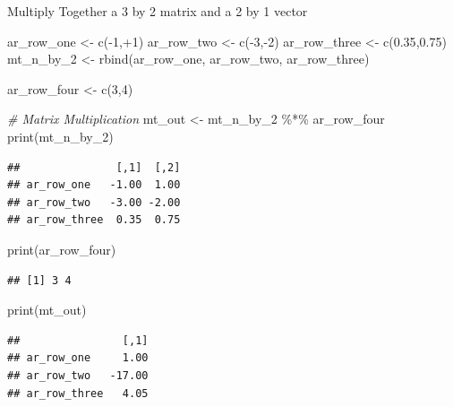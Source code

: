 \documentclass[
]{book}
\newenvironment{Shaded}{\begin{snugshade}}{\end{snugshade}}
\newcommand{\CommentTok}[1]{\textcolor[rgb]{0.56,0.35,0.01}{\textit{#1}}}
\newcommand{\DecValTok}[1]{\textcolor[rgb]{0.00,0.00,0.81}{#1}}
\newcommand{\FloatTok}[1]{\textcolor[rgb]{0.00,0.00,0.81}{#1}}
\newcommand{\FunctionTok}[1]{\textcolor[rgb]{0.00,0.00,0.00}{#1}}
\newcommand{\NormalTok}[1]{#1}
\newcommand{\OtherTok}[1]{\textcolor[rgb]{0.56,0.35,0.01}{#1}}
\newcommand{\SpecialCharTok}[1]{\textcolor[rgb]{0.00,0.00,0.00}{#1}}
\begin{document}
Multiply Together a 3 by 2 matrix and a 2 by 1 vector

\begin{Shaded}
\begin{Highlighting}[]
\NormalTok{ar\_row\_one }\OtherTok{\textless{}{-}} \FunctionTok{c}\NormalTok{(}\SpecialCharTok{{-}}\DecValTok{1}\NormalTok{,}\SpecialCharTok{+}\DecValTok{1}\NormalTok{)}
\NormalTok{ar\_row\_two }\OtherTok{\textless{}{-}} \FunctionTok{c}\NormalTok{(}\SpecialCharTok{{-}}\DecValTok{3}\NormalTok{,}\SpecialCharTok{{-}}\DecValTok{2}\NormalTok{)}
\NormalTok{ar\_row\_three }\OtherTok{\textless{}{-}} \FunctionTok{c}\NormalTok{(}\FloatTok{0.35}\NormalTok{,}\FloatTok{0.75}\NormalTok{)}
\NormalTok{mt\_n\_by\_2 }\OtherTok{\textless{}{-}} \FunctionTok{rbind}\NormalTok{(ar\_row\_one, ar\_row\_two, ar\_row\_three)}

\NormalTok{ar\_row\_four }\OtherTok{\textless{}{-}} \FunctionTok{c}\NormalTok{(}\DecValTok{3}\NormalTok{,}\DecValTok{4}\NormalTok{)}

\CommentTok{\# Matrix Multiplication}
\NormalTok{mt\_out }\OtherTok{\textless{}{-}}\NormalTok{ mt\_n\_by\_2 }\SpecialCharTok{\%*\%}\NormalTok{ ar\_row\_four}
\FunctionTok{print}\NormalTok{(mt\_n\_by\_2)}
\end{Highlighting}
\end{Shaded}

\begin{verbatim}
##               [,1]  [,2]
## ar_row_one   -1.00  1.00
## ar_row_two   -3.00 -2.00
## ar_row_three  0.35  0.75
\end{verbatim}

\begin{Shaded}
\begin{Highlighting}[]
\FunctionTok{print}\NormalTok{(ar\_row\_four)}
\end{Highlighting}
\end{Shaded}

\begin{verbatim}
## [1] 3 4
\end{verbatim}

\begin{Shaded}
\begin{Highlighting}[]
\FunctionTok{print}\NormalTok{(mt\_out)}
\end{Highlighting}
\end{Shaded}

\begin{verbatim}
##                [,1]
## ar_row_one     1.00
## ar_row_two   -17.00
## ar_row_three   4.05
\end{verbatim}
\end{document}
